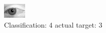 \begin{figure}[h!]
\begin{center}
\includegraphics[width=0.60\columnwidth]{figures/ID2800_class_4_target_3.png}
\end{center}
\caption{ Classification: 4 actual target: 3}
\label{fig:ID2800_class_4_target_3}
\end{figure}
